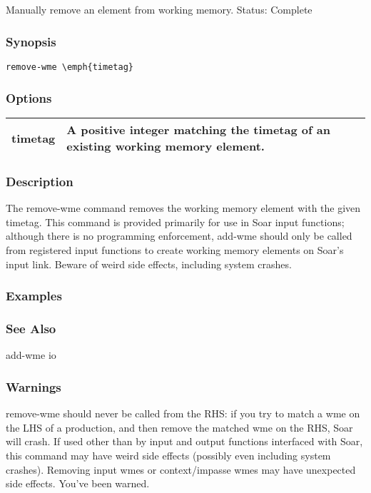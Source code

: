 \subsection{}
\label{remove-wme}
Manually remove an element from working memory. 
 Status: Complete
\subsubsection*{Synopsis}
\begin{verbatim}
remove-wme \emph{timetag}
\end{verbatim}
\subsubsection*{Options}
\begin{tabular}{|l|l|}
\hline 
 timetag  & A positive integer matching the timetag of an existing working memory element.  \\
 \hline 
\end{tabular}
\subsubsection*{Description}
 The remove-wme command removes the working memory element with the given timetag. This command is provided primarily for use in Soar input functions; although there is no programming enforcement, add-wme should only be called from registered input functions to create working memory elements on Soar's input link. 
 Beware of weird side effects, including system crashes. 
\subsubsection*{Examples}
\subsubsection*{See Also}
 add-wme io
\subsubsection*{Warnings}
 remove-wme should never be called from the RHS: if you try to match a wme on the LHS of a production, and then remove the matched wme on the RHS, Soar will crash. 
 If used other than by input and output functions interfaced with Soar, this command may have weird side effects (possibly even including system crashes). Removing input wmes or context/impasse wmes may have unexpected side effects. You've been warned. 
